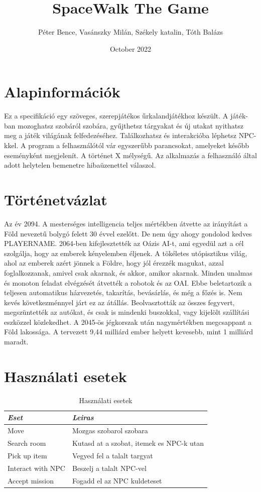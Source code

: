 \documentclass{scrbook}
\title{SpaceWalk The Game}
\author{Péter Bence, Vasánszky Milán, Székely katalin, Tóth Balázs}
\date{October 2022}
\begin{document}
\maketitle

\section{Alapinformációk} 
Ez a specifikáció egy szöveges, szerepjátékos űrkalandjátékhoz készült. A játék- ban mozoghatsz szobáról szobára, gyűjthetsz tárgyakat és új utakat nyithatsz meg a játék világának felfedezéséhez. Találkozhatsz és interakcióba léphetsz NPC-kkel. A program a felhasználótól vár egyszerűbb parancsokat, amelyeket később eseményként megjelenít. A történet X mélységű. Az alkalmazás a felhasználó által adott helytelen bemenetre hibaüzenettel válaszol.

\section{Történetvázlat}
Az év 2094. A mesterséges intelligencia teljes mértékben átvette az irányítást a Föld nevezetű bolygó felett 30 évvel ezelőtt. De nem úgy ahogy gondolod kedves PLAYERNAME. 2064-ben kifejlesztették az Oázis AI-t, ami egyedül azt a cél szolgálja, hogy az emberek kényelemben éljenek. A tökéletes utópisztikus világ, ahol az emberek azért jönnek a Földre, hogy jól érezzék magukat, azzal foglalkozzanak, amivel csak akarnak, és akkor, amikor akarnak. Minden unalmas és monoton feladat elvégzését átvették a robotok és az OAI. Ebbe beletartozik a teljesen automatikus házvezetés, takarítás, bevásárlás, és még a főzés is. Nem kevés következménnyel járt ez az átállás. Beolvasztották az összes fegyvert, megszüntették az autókat, és csak is mindenki buszokkal, vagy kijelölt szállítási eszközzel közlekedhet. A 2045-ös jégkorszak után nagymértékben megcsappant a Föld lakossága. A tervezett 9,44 milliárd ember helyett kevesebb, mint 1 milliárd maradt.

\section{Használati esetek}
\begin{table}[h] \centering
    \caption{Használati esetek}\label{tab:usecasetable}
    \begin{tabular}{@{}ll@{}}
        \emph{Eset} & \emph{Leiras}\\ \hline
        Move         & Mozgas szobarol szobara\\
        Search room  & Kutasd at a szobat, itemek es NPC-k utan\\
        Pick up item & Vegyed fel a talalt targyat\\
        Interact with NPC & Beszelj a talalt NPC-vel\\
        Accept mission & Fogadd el az NPC kuldeteset
    \end{tabular}
\end{table}
\end{document}
